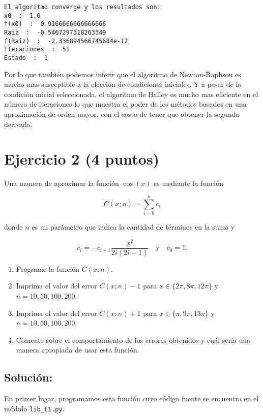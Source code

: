 \documentclass[11pt]{article}
\providecommand{\tightlist}{%
      \setlength{\itemsep}{0pt}\setlength{\parskip}{0pt}}
\begin{document}
    \begin{Verbatim}[commandchars=\\\{\}]
El algoritmo converge y los resultados son:
x0  :  1.0
f(x0)  :  0.9166666666666666
Raiz  :  -0.5467297318263349
f(Raiz)  :  -2.336894566745684e-12
Iteraciones  :  51
Estado  :  1
    \end{Verbatim}

    Por lo que también podemos inferir que el algoritmo de Newton-Raphson es
mucho mas susceptible a la elección de condiciones iniciales. Y a pesar
de la condición inicial seleccionada, el algoritmo de Halley es mucho
mas eficiente en el número de iteraciones lo que muestra el poder de los
métodos basados en una aproximación de orden mayor, con el costo de
tener que obtener la segunda derivada.

    \hypertarget{ejercicio-2-4-puntos}{%
\section{Ejercicio 2 (4 puntos)}\label{ejercicio-2-4-puntos}}

Una manera de aproximar la función \(\cos(x)\) es mediante la función

\[ C(x; n) =  \sum_{i=0}^n c_i \]

donde \(n\) es un parámetro que indica la cantidad de términos en la
suma y

\[ c_i = -c_{i-1} \frac{x^2}{2i(2i-1)} \quad \text{y} \quad c_0 = 1.\]

\begin{enumerate}
\def\labelenumi{\arabic{enumi}.}
\tightlist
\item
  Programe la función \(C(x;n)\).
\item
  Imprima el valor del error \(C(x;n)-1\) para
  \(x \in \{2\pi, 8\pi, 12\pi \}\) y \(n = 10, 50, 100, 200\).
\item
  Imprima el valor del error \(C(x;n)+1\) para
  \(x \in \{\pi, 9\pi, 13\pi \}\) y \(n = 10, 50, 100, 200\).
\item
  Comente sobre el comportamiento de los errores obtenidos y cuál sería
  una manera apropiada de usar esta función.
\end{enumerate}

\hypertarget{soluciuxf3n}{%
\subsection{Solución:}\label{soluciuxf3n}}

    En primer lugar, programamos esta función cuyo código fuente se
encuentra en el módulo \texttt{lib\_t1.py}.
\end{document}
